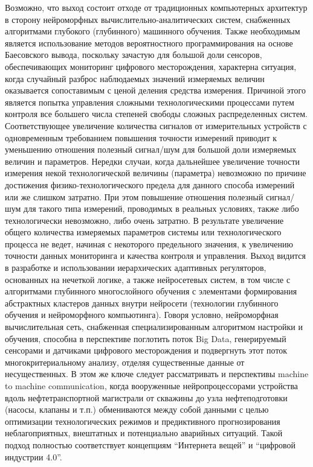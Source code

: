 Возможно, что выход состоит отходе от традиционных компьютерных архитектур в сторону нейроморфных вычислительно-аналитических систем, снабженных алгоритмами глубокого (глубинного) машинного обучения.
Также необходимым является использование методов вероятностного программирования на основе Баесовского вывода, поскольку зачастую для большой доли сенсоров,  обеспечивающих мониторинг цифрового месторождения, характерна ситуация, когда случайный разброс наблюдаемых значений измеряемых величин оказывается сопоставимым с ценой деления средства измерения.
Причиной этого является попытка управления сложными технологическими процессами путем контроля все большего числа степеней свободы сложных распределенных систем.
Соответствующее увеличение количества сигналов от измерительных устройств с одновременным требованием повышения точности измерений приводит к уменьшению отношения полезный сигнал/шум для большой доли измеряемых величин и параметров.
Нередки случаи, когда дальнейшее увеличение точности измерения некой технологической величины (параметра) невозможно по причине достижения физико-технологического предела для данного способа измерений или же слишком затратно.
При этом повышение отношения полезный сигнал/шум для такого типа измерений, проводимых в реальных условиях, также либо технологически невозможно, либо очень затратно.
В результате увеличение общего количества измеряемых параметров системы или технологического процесса не ведет, начиная с некоторого предельного значения, к увеличению точности данных мониторинга и качества контроля и управления.
Выход видится в разработке и использовании иерархических адаптивных регуляторов, основанных на нечеткой логике, а также нейросетевых систем, в том числе с алгоритмами глубинного многослойного обучения с элементами формирования абстрактных кластеров данных внутри нейросети (технологии глубинного обучения и нейроморфного компьютинга).
Говоря условно, нейроморфная вычислительная сеть, снабженная специализированным алгоритмом настройки и обучения, способна в перспективе поглотить поток Big Data, генерируемый сенсорами и датчиками цифрового месторождения и подвергнуть этот поток многокритериальному анализу, отделяя существенные данные от несущественных.
В этом же ключе следует рассматривать и перспективы machine to machine communication, когда вооруженные нейропроцессорами устройства вдоль нефтетранспортной магистрали от скважины до узла нефтеподготовки (насосы, клапаны и т.п.) обмениваются между собой данными с целью оптимизации технологических режимов и предиктивного прогнозирования неблагоприятных, внештатных и потенциально аварийных ситуаций.
Такой подход полностью соответствует концепциям ``Интернета вещей'' и ``цифровой индустрии 4.0''.

